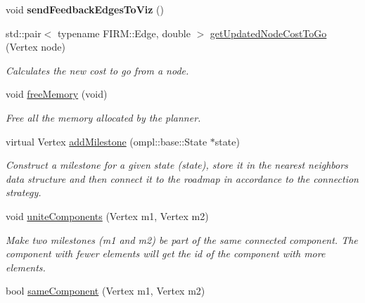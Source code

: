 \begin{DoxyCompactItemize}
\item 
\hypertarget{class_f_i_r_m_a8d9e316c11b1e2ff52b5ff65996d3a01}{void {\bfseries send\-Feedback\-Edges\-To\-Viz} ()}\label{class_f_i_r_m_a8d9e316c11b1e2ff52b5ff65996d3a01}

\item 
\hypertarget{class_f_i_r_m_a44321fba1c038c1f43ccfeccf9a1c44c}{std\-::pair$<$ typename \-F\-I\-R\-M\-::\-Edge, \*
double $>$ \hyperlink{class_f_i_r_m_a44321fba1c038c1f43ccfeccf9a1c44c}{get\-Updated\-Node\-Cost\-To\-Go} (\-Vertex node)}\label{class_f_i_r_m_a44321fba1c038c1f43ccfeccf9a1c44c}

\begin{DoxyCompactList}\small\item\em \-Calculates the new cost to go from a node. \end{DoxyCompactList}\item 
\hypertarget{class_f_i_r_m_af6951ffec04529fd8da990978d7d8d19}{void \hyperlink{class_f_i_r_m_af6951ffec04529fd8da990978d7d8d19}{free\-Memory} (void)}\label{class_f_i_r_m_af6951ffec04529fd8da990978d7d8d19}

\begin{DoxyCompactList}\small\item\em \-Free all the memory allocated by the planner. \end{DoxyCompactList}\item 
\hypertarget{class_f_i_r_m_a6b72ace6d1708b25bf8c7f69331ae82b}{virtual \-Vertex \hyperlink{class_f_i_r_m_a6b72ace6d1708b25bf8c7f69331ae82b}{add\-Milestone} (ompl\-::base\-::\-State $\ast$state)}\label{class_f_i_r_m_a6b72ace6d1708b25bf8c7f69331ae82b}

\begin{DoxyCompactList}\small\item\em \-Construct a milestone for a given state ({\itshape state\/}), store it in the nearest neighbors data structure and then connect it to the roadmap in accordance to the connection strategy. \end{DoxyCompactList}\item 
\hypertarget{class_f_i_r_m_a34535f25e4f3fb645fb65d57e3faf01b}{void \hyperlink{class_f_i_r_m_a34535f25e4f3fb645fb65d57e3faf01b}{unite\-Components} (\-Vertex m1, \-Vertex m2)}\label{class_f_i_r_m_a34535f25e4f3fb645fb65d57e3faf01b}

\begin{DoxyCompactList}\small\item\em \-Make two milestones ({\itshape m1\/} and {\itshape m2\/}) be part of the same connected component. \-The component with fewer elements will get the id of the component with more elements. \end{DoxyCompactList}\item 
\hypertarget{class_f_i_r_m_a2045f113f0755ae8eeac2c35c7c08d41}{bool \hyperlink{class_f_i_r_m_a2045f113f0755ae8eeac2c35c7c08d41}{same\-Component} (\-Vertex m1, \-Vertex m2)}\label{class_f_i_r_m_a2045f113f0755ae8eeac2c35c7c08d41}


\end{DoxyCompactItemize}
